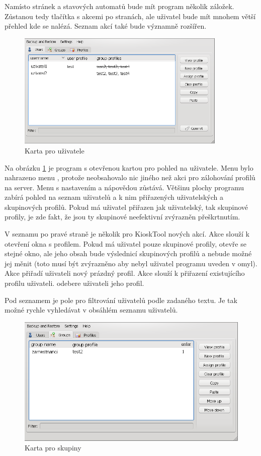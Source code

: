 Namísto stránek a stavových automatů bude mít program několik záložek. Zůstanou tedy tlačítka s akcemi po stranách, ale uživatel bude mít mnohem větší přehled kde se nalézá. Seznam akcí také bude významně rozšířen.

\begin{figure}
\centering
\includegraphics[width=10cm]{obrazky/navrh-usersz.png}
\caption{Karta pro uživatele}
\label{fig:kt4_newusers}
\end{figure}

Na obrázku \ref{fig:kt4_newusers} je program s otevřenou kartou pro pohled na uživatele. Menu  bylo nahrazeno menu , protože neobsahovalo nic jiného než akci pro zálohování profilů na server. Menu s nastavením a nápovědou zůstává. Většinu plochy programu zabírá pohled na seznam uživatelů a k nim přiřazených uživatelských a skupinových profilů. Pokud má uživatel přiřazen jak uživatelský, tak skupinové profily, je zde fakt, že jsou ty skupinové neefektivní zvýrazněn přeškrtnutím.

V seznamu po pravé straně je několik pro KioskTool nových akcí. Akce  slouží k otevření okna s profilem. Pokud má uživatel pouze skupinové profily, otevře se stejné okno, ale jeho obsah bude výslednicí skupinových profilů a nebude možné jej měnit (toto musí být zvýrazněno aby nebyl uživatel programu uveden v omyl). Akce  přiřadí uživateli nový prázdný profil. Akce  slouží k přiřazení existujícího profilu uživateli.  odebere uživateli jeho profil.

Pod seznamem je pole pro filtrování uživatelů podle zadaného textu. Je tak možné rychle vyhledávat v obsáhlém seznamu uživatelů.

\begin{figure}
\centering
\includegraphics[width=13cm]{obrazky/navrh-groupsz.png}
\caption{Karta pro skupiny}
\label{fig:kt4_newgroups}
\end{figure}


